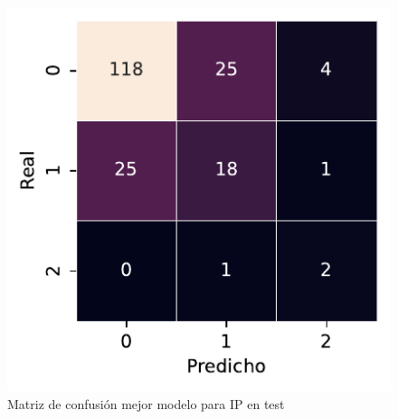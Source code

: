 \begin{figure}[htbp]
    \vspace{1.5em} %

    \includegraphics[width=0.75\linewidth]{figures/5_experiments/single-ip-cm.pdf}
    \caption{Matriz de confusión mejor modelo para IP en test}
    \label{fig5:IP_confusion_matrix}
\end{figure}

